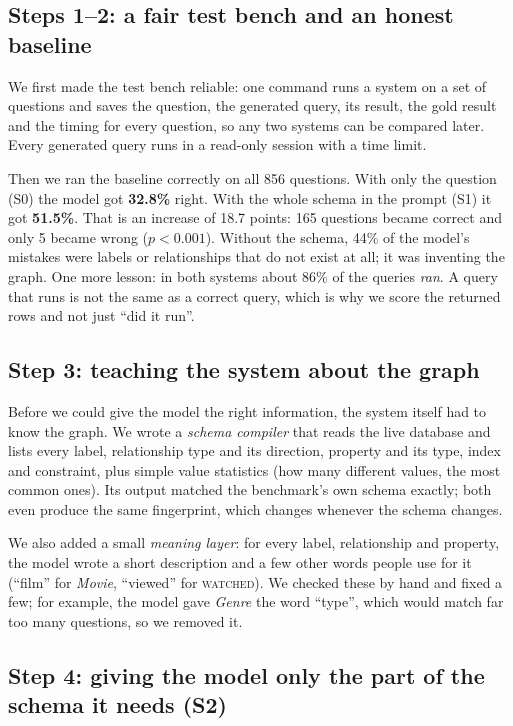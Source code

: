 \documentclass[11pt,a4paper]{article}
\begin{document}
\subsection{Steps 1--2: a fair test bench and an honest baseline}
\label{sec:baseline}

We first made the test bench reliable: one command runs a system on a set of questions
and saves the question, the generated query, its result, the gold result and the timing
for every question, so any two systems can be compared later. Every generated query runs
in a read-only session with a time limit.

Then we ran the baseline correctly on all 856 questions. With only the question (S0) the
model got \textbf{32.8\%} right. With the whole schema in the prompt (S1) it got
\textbf{51.5\%}. That is an increase of 18.7 points: 165 questions became correct and only
5 became wrong ($p<0.001$). Without the schema, 44\% of the model's mistakes were labels
or relationships that do not exist at all; it was inventing the graph. One more lesson: in
both systems about 86\% of the queries \emph{ran}. A query that runs is not the same as a
correct query, which is why we score the returned rows and not just ``did it run''.

\subsection{Step 3: teaching the system about the graph}

Before we could give the model the right information, the system itself had to know the
graph. We wrote a \emph{schema compiler} that reads the live database and lists every
label, relationship type and its direction, property and its type, index and constraint,
plus simple value statistics (how many different values, the most common ones). Its output
matched the benchmark's own schema exactly; both even produce the same fingerprint, which
changes whenever the schema changes.

We also added a small \emph{meaning layer}: for every label, relationship and property, the
model wrote a short description and a few other words people use for it (``film'' for
\emph{Movie}, ``viewed'' for \textsc{watched}). We checked these by hand and fixed a few;
for example, the model gave \emph{Genre} the word ``type'', which would match far too many
questions, so we removed it.

\subsection{Step 4: giving the model only the part of the schema it needs (S2)}
\end{document}
